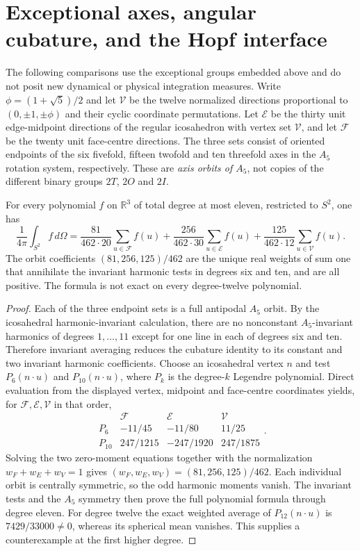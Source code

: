 \documentclass[11pt]{article}
\begin{document}
\clearpage
\section{Exceptional axes, angular cubature, and the Hopf interface}
\label{p1b:sec:new-exceptional-axis-cubature}
\noindent
The following comparisons use the exceptional groups embedded above
and do not posit new dynamical or physical integration measures.  Write
$\phi=(1+\sqrt5)/2$ and let $\mathcal V$ be the twelve normalized directions
proportional to $(0,\pm1,\pm\phi)$ and their cyclic coordinate
permutations.  Let $\mathcal E$ be the thirty unit edge-midpoint directions
of the regular icosahedron with vertex set $\mathcal V$, and let
$\mathcal F$ be the twenty unit face-centre directions.
The three sets consist of oriented endpoints of the six fivefold, fifteen
twofold and ten threefold axes in the $A_5$ rotation system, respectively.
These are \emph{axis orbits of $A_5$}, not copies of the different binary
groups $2T$, $2O$ and $2I$.

\begin{theorem}
\label{p1b:thm:new-62-point-angular-cubature}
For every polynomial $f$ on $\mathbb R^3$ of total degree at most eleven,
restricted to $S^2$, one has
\[
 \frac1{4\pi}\int_{S^2} f\,d\Omega
 =\frac{81}{462\cdot20}\sum_{u\in\mathcal F}f(u)
 +\frac{256}{462\cdot30}\sum_{u\in\mathcal E}f(u)
 +\frac{125}{462\cdot12}\sum_{u\in\mathcal V}f(u).
\]
The orbit coefficients $(81,256,125)/462$ are the unique real weights of
sum one that annihilate the invariant harmonic tests in degrees six and ten,
and are all positive.  The formula is not exact on every degree-twelve
polynomial.
\end{theorem}
\begin{proof}
Each of the three endpoint sets is a full antipodal $A_5$ orbit.  By the
icosahedral harmonic-invariant calculation, there are no nonconstant
$A_5$-invariant harmonics of degrees $1,\ldots,11$ except for one line
in each of degrees six and ten.  Therefore invariant averaging reduces the
cubature identity to its constant and two invariant harmonic coefficients.
Choose an icosahedral vertex $n$ and test $P_6(n\cdot u)$ and
$P_{10}(n\cdot u)$, where $P_k$ is the degree-$k$ Legendre polynomial.
Direct evaluation from the displayed vertex, midpoint and face-centre
coordinates yields, for $\mathcal F,\mathcal E,\mathcal V$ in that order,
\[
\begin{array}{c|ccc}
 &\mathcal F&\mathcal E&\mathcal V\\\hline
 P_6&-11/45&-11/80&11/25\\
 P_{10}&247/1215&-247/1920&247/1875
\end{array}.
\]
Solving the two zero-moment equations together with the normalization
$w_F+w_E+w_V=1$ gives $(w_F,w_E,w_V)=(81,256,125)/462$.
Each individual orbit is centrally symmetric, so the odd harmonic moments
vanish.  The invariant tests and the $A_5$ symmetry then prove the full
polynomial formula through degree eleven.  For degree twelve the exact
weighted average of $P_{12}(n\cdot u)$ is $7429/33000\ne0$, whereas its
spherical mean vanishes.  This supplies a counterexample at the first
higher degree.
\end{proof}
\end{document}
